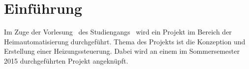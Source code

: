 \section{Einführung}
Im Zuge der Vorlesung \betreff\ des Studiengangs \ausbildungsberuf\ wird ein Projekt im Bereich der Heimautomatisierung durchgeführt.
Thema des Projekts ist die Konzeption und Erstellung einer Heizungssteuerung. Dabei wird an einem im Sommersemester 2015 durchgeführten Projekt angeknüpft.